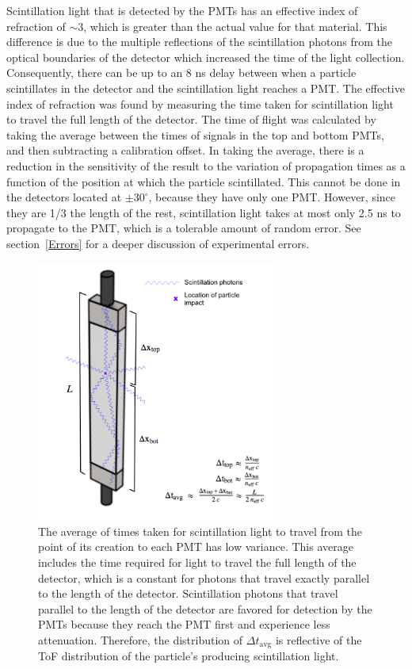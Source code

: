 Scintillation light that is detected by the PMTs has an effective index of refraction of $\sim$3, which is greater than the actual value for that material.
This difference is due to the multiple reflections of the scintillation photons from the optical boundaries of the detector which increased the time of the light collection.
Consequently, there can be up to an 8 ns delay between when a particle scintillates in the detector and the scintillation light reaches a PMT.
The effective index of refraction was found by measuring the time taken for scintillation light to travel the full length of the detector.
The time of flight was calculated by taking the average between the times of signals in the top and bottom PMTs, and then subtracting a calibration offset.
In taking the average, there is a reduction in the sensitivity of the result to the variation of propagation times as a function of the position at which the particle scintillated.
This cannot be done in the detectors located at $\pm30^{\circ}$, because they have only one PMT.
However, since they are 1/3 the length of the rest, scintillation light takes at most only 2.5 ns to propagate to the PMT, which is a tolerable amount of random error.
See section~\ref{Errors} for a deeper discussion of experimental errors.

\begin{figure}[h]
\includegraphics[width=0.7\textwidth]{Content/Methods/LightPaths.png}
\caption{The average of times taken for scintillation light to travel from the point of its creation to each PMT has low variance.
This average includes the time required for light to travel the full length of the detector, which is a constant for photons that travel exactly parallel to the length of the detector.
Scintillation photons that travel parallel to the length of the detector are favored for detection by the PMTs because they reach the PMT first and experience less attenuation.
Therefore, the distribution of $\Delta t_{\text{avg}}$ is reflective of the ToF distribution of the particle's producing scintillation light.}
\label{fig:LightPaths}
\end{figure}

